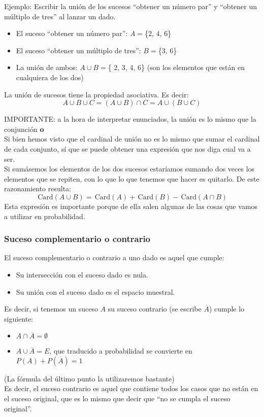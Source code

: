 \documentclass[a4paper,10pt,answers]{exam}
\newcommand{\Card}{\,\mathrm{Card}}
\begin{document}
Ejemplo: Escribir la unión de los sucesos ``obtener un número par'' y ``obtener un múltiplo de tres'' al lanzar un dado.
\begin{itemize}
	\item El suceso ``obtener un número par'': $A=$\{2, 4, 6\}
	\item El suceso ``obtener un múltiplo de tres'': $B=$\{3, 6\}
	\item La unión de ambos: $A \cup B=$\{ 2, 3, 4, 6\} (son los elementos que están en cualquiera de los dos)
\end{itemize}

La unión de sucesos tiene la propiedad asociativa. Es decir:
\[A \cup B \cup C = (A \cup B) \cap C = A \cup (B \cup C)\]

{\Large IMPORTANTE: a la hora de interpretar enunciados, la unión es lo mismo que la conjunción \textbf{o}}\\

Si bien hemos visto que el cardinal de unión no es lo mismo que sumar el cardinal de cada conjunto, sí que se puede obtener una expresión que nos diga cual va a ser.\\
Si sumásemos los elementos de los dos sucesos estaríamos sumando dos veces los elementos que se repiten, con lo que lo que tenemos que hacer es quitarlo. De este razonamiento resulta:
\[
\Card (A \cup B ) = \Card (A) +  \Card (B) - \Card (A \cap B)
\]
Esta expresión es importante porque de ella salen algunas de las cosas que vamos a utilizar en probabilidad.

\subsubsection{Suceso complementario o contrario}
El suceso complementario o contrario a uno dado es aquel que cumple:
\begin{itemize}
	\item Su intersección con el suceso dado es nula.
	\item Su unión con el suceso dado es el espacio muestral.
\end{itemize}
Es decir, si tenemos un suceso $A$ su suceso contrario (se escribe $\overline{A}$) cumple lo siguiente:
\begin{itemize}
	\item $A \cap \overline{A} = \emptyset$
	\item $A \cup \overline{A} = E$, que traducido a probabilidad se convierte en $P(A) + P(\overline{A}) = 1$
\end{itemize}
(La fórmula del último punto la utilizaremos bastante)\\
Es decir, el suceso contrario es aquel que contiene todos los casos que no están en el suceso original, que es lo mismo que decir que ``no se cumpla el suceso original''.\\
\end{document}
